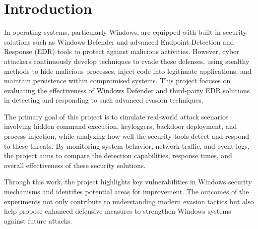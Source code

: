 \setcounter{secnumdepth}{-1}

\chapter{Introduction}

In operating systems, particularly Windows, are equipped with built-in security solutions such as Windows Defender and advanced Endpoint Detection and Response (EDR) tools to protect against malicious activities. However, cyber attackers continuously develop techniques to evade these defenses, using stealthy methods to hide malicious processes, inject code into legitimate applications, and maintain persistence within compromised systems. This project focuses on evaluating the effectiveness of Windows Defender and third-party EDR solutions in detecting and responding to such advanced evasion techniques.

The primary goal of this project is to simulate real-world attack scenarios involving hidden command execution, keyloggers, backdoor deployment, and process injection, while analyzing how well the security tools detect and respond to these threats. By monitoring system behavior, network traffic, and event logs, the project aims to compare the detection capabilities, response times, and overall effectiveness of these security solutions.

Through this work, the project highlights key vulnerabilities in Windows security mechanisms and identifies potential areas for improvement. The outcomes of the experiments not only contribute to understanding modern evasion tactics but also help propose enhanced defensive measures to strengthen Windows systems against future attacks.



